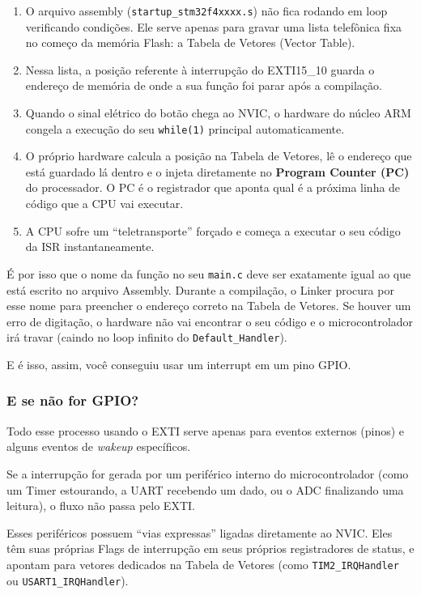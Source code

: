 \documentclass[12pt,a4paper]{article}
\begin{document}
\begin{enumerate}
    \item O arquivo assembly (\texttt{startup\_stm32f4xxxx.s}) não fica rodando em loop verificando condições. Ele serve apenas para gravar uma lista telefônica fixa no começo da memória Flash: a Tabela de Vetores (Vector Table).
    \item Nessa lista, a posição referente à interrupção do EXTI15\_10 guarda o endereço de memória de onde a sua função foi parar após a compilação.
    \item Quando o sinal elétrico do botão chega ao NVIC, o hardware do núcleo ARM congela a execução do seu \texttt{while(1)} principal automaticamente.
    \item O próprio hardware calcula a posição na Tabela de Vetores, lê o endereço que está guardado lá dentro e o injeta diretamente no \textbf{Program Counter (PC)} do processador. O PC é o registrador que aponta qual é a próxima linha de código que a CPU vai executar.
    \item A CPU sofre um ``teletransporte'' forçado e começa a executar o seu código da ISR instantaneamente.
\end{enumerate}

É por isso que o nome da função no seu \texttt{main.c} deve ser exatamente igual ao que está escrito no arquivo Assembly. Durante a compilação, o Linker procura por esse nome para preencher o endereço correto na Tabela de Vetores. Se houver um erro de digitação, o hardware não vai encontrar o seu código e o microcontrolador irá travar (caindo no loop infinito do \texttt{Default\_Handler}).

E é isso, assim, você conseguiu usar um interrupt em um pino GPIO.

\subsubsection{E se não for GPIO?}

Todo esse processo usando o EXTI serve apenas para eventos externos (pinos) e alguns eventos de \textit{wakeup} específicos.

Se a interrupção for gerada por um periférico interno do microcontrolador (como um Timer estourando, a UART recebendo um dado, ou o ADC finalizando uma leitura), o fluxo não passa pelo EXTI.

Esses periféricos possuem ``vias expressas'' ligadas diretamente ao NVIC. Eles têm suas próprias Flags de interrupção em seus próprios registradores de status, e apontam para vetores dedicados na Tabela de Vetores (como \texttt{TIM2\_IRQHandler} ou \texttt{USART1\_IRQHandler}).
\end{document}
